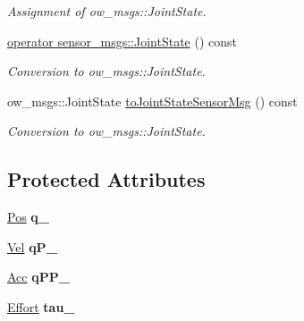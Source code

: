 \begin{DoxyCompactItemize}
\begin{DoxyCompactList}\small\item\em Assignment of ow\+\_\+msgs\+::\+Joint\+State. \end{DoxyCompactList}\item 
\hyperlink{classow__core_1_1JointState_a0713be47cec424528498f3251f87b869}{operator sensor\+\_\+msgs\+::\+Joint\+State} () const \hypertarget{classow__core_1_1JointState_a0713be47cec424528498f3251f87b869}{}\label{classow__core_1_1JointState_a0713be47cec424528498f3251f87b869}

\begin{DoxyCompactList}\small\item\em Conversion to ow\+\_\+msgs\+::\+Joint\+State. \end{DoxyCompactList}\item 
ow\+\_\+msgs\+::\+Joint\+State \hyperlink{classow__core_1_1JointState_a283d432a891d55b21125c580711cbdcd}{to\+Joint\+State\+Sensor\+Msg} () const \hypertarget{classow__core_1_1JointState_a283d432a891d55b21125c580711cbdcd}{}\label{classow__core_1_1JointState_a283d432a891d55b21125c580711cbdcd}

\begin{DoxyCompactList}\small\item\em Conversion to ow\+\_\+msgs\+::\+Joint\+State. \end{DoxyCompactList}\end{DoxyCompactItemize}
\subsection*{Protected Attributes}
\begin{DoxyCompactItemize}
\item 
\hyperlink{classow__core_1_1JointPosition}{Pos} {\bfseries q\+\_\+}\hypertarget{classow__core_1_1JointState_a8e802c0eb46ffafb7ed124bbde8926a8}{}\label{classow__core_1_1JointState_a8e802c0eb46ffafb7ed124bbde8926a8}

\item 
\hyperlink{classow__core_1_1JointVelocity}{Vel} {\bfseries q\+P\+\_\+}\hypertarget{classow__core_1_1JointState_afffed2181bae8208f0be4aca106fe3d3}{}\label{classow__core_1_1JointState_afffed2181bae8208f0be4aca106fe3d3}

\item 
\hyperlink{classow__core_1_1JointAcceleration}{Acc} {\bfseries q\+P\+P\+\_\+}\hypertarget{classow__core_1_1JointState_a4f9fa9f27626a88245ce603c88a90f98}{}\label{classow__core_1_1JointState_a4f9fa9f27626a88245ce603c88a90f98}

\item 
\hyperlink{classow__core_1_1JointEffort}{Effort} {\bfseries tau\+\_\+}\hypertarget{classow__core_1_1JointState_a81bed6b039886854737c3f9fdbe3182d}{}\label{classow__core_1_1JointState_a81bed6b039886854737c3f9fdbe3182d}

\end{DoxyCompactItemize}

